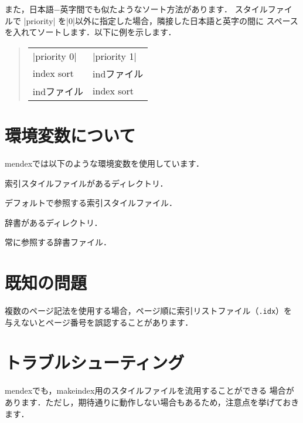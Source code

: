 \documentclass[a4paper]{jsarticle}
\newcommand{\SoftName}[1]{\textsf{#1}}
\newcommand{\FileExtension}[1]{\texttt{.#1}}
\begin{document}
また，日本語−英字間でも似たようなソート方法があります．
スタイルファイルで |priority| を|0|以外に指定した場合，隣接した日本語と英字の間に
スペースを入れてソートします．以下に例を示します．
%
\begin{quote}
\begin{tabular}{ll}
|priority 0| & |priority 1| \\
index sort & indファイル \\
indファイル & index sort
\end{tabular}
\end{quote}

\section{環境変数について}

\SoftName{mendex}では以下のような環境変数を使用しています．

\begin{description}[leftmargin=5cm]
\item[|INDEXSTYLE|]
索引スタイルファイルがあるディレクトリ．

\item[|INDEXDEFAULTSTYLE|]
デフォルトで参照する索引スタイルファイル．

\item[|INDEXDICTIONARY|]
辞書があるディレクトリ．

\item[|INDEXDEFAULTDICTIONARY|]
常に参照する辞書ファイル．
\end{description}

\section{既知の問題}
複数のページ記法を使用する場合，ページ順に索引リストファイル（\FileExtension{idx}）を
与えないとページ番号を誤認することがあります．


\section{トラブルシューティング}
\SoftName{mendex}でも，\SoftName{makeindex}用のスタイルファイルを流用することができる
場合があります．ただし，期待通りに動作しない場合もあるため，注意点を挙げておきます．
\end{document}
